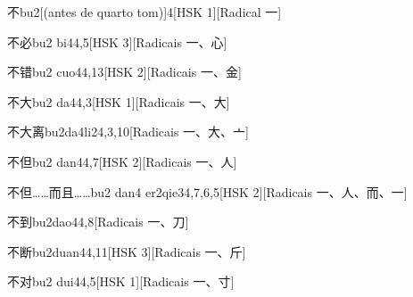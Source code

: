 \begin{entry}{不}{bu2}[(antes de quarto tom)]{4}[HSK 1][Radical ⼀]
\end{entry}

\begin{entry}{不必}{bu2 bi4}{4,5}[HSK 3][Radicais ⼀、⼼]
\end{entry}

\begin{entry}{不错}{bu2 cuo4}{4,13}[HSK 2][Radicais ⼀、⾦]
\end{entry}

\begin{entry}{不大}{bu2 da4}{4,3}[HSK 1][Radicais ⼀、⼤]
\end{entry}

\begin{entry}{不大离}{bu2da4li2}{4,3,10}[Radicais ⼀、⼤、⼇]
\end{entry}

\begin{entry}{不但}{bu2 dan4}{4,7}[HSK 2][Radicais ⼀、⼈]
\end{entry}

\begin{entry}{不但……而且……}{bu2 dan4 er2qie3}{4,7,6,5}[HSK 2][Radicais ⼀、⼈、⽽、⼀]
\end{entry}

\begin{entry}{不到}{bu2dao4}{4,8}[Radicais ⼀、⼑]
\end{entry}

\begin{entry}{不断}{bu2duan4}{4,11}[HSK 3][Radicais ⼀、⽄]
\end{entry}

\begin{entry}{不对}{bu2 dui4}{4,5}[HSK 1][Radicais ⼀、⼨]
\end{entry}

